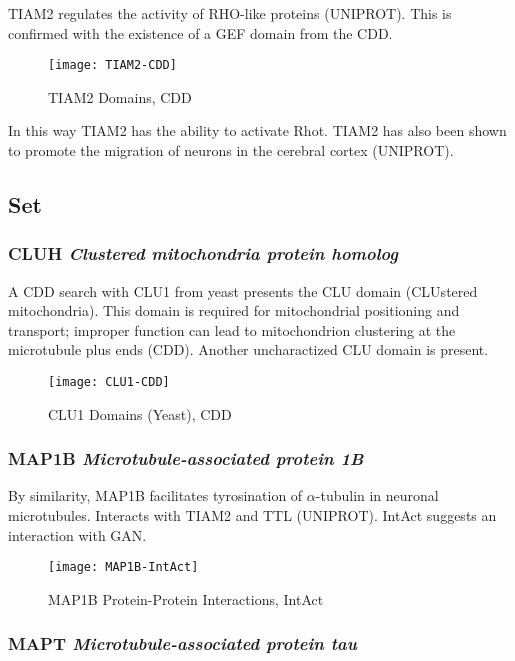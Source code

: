 TIAM2 regulates the activity of RHO-like proteins (UNIPROT). This is confirmed
with the existence of a GEF domain from the CDD.

\begin{figure}[h]
  \texttt{[image: TIAM2-CDD]}
  \caption{TIAM2 Domains, CDD}
\end{figure}



In this way TIAM2 has the ability to activate Rhot. TIAM2 has also been shown to
promote the migration of neurons in the cerebral cortex (UNIPROT).

\subsection{Set}

\subsubsection{CLUH \textit{Clustered mitochondria protein homolog}}

A CDD search with CLU1 from yeast presents the CLU domain (CLUstered
mitochondria). This domain is required for mitochondrial positioning and
transport; improper function can lead to mitochondrion clustering at the
microtubule plus ends (CDD). Another uncharactized CLU domain is present.

\begin{figure}[h]
  \texttt{[image: CLU1-CDD]}
  \caption{CLU1 Domains (Yeast), CDD}
\end{figure}

\subsubsection{MAP1B \textit{Microtubule-associated protein 1B}}

By similarity, MAP1B facilitates tyrosination of $\alpha$-tubulin in
neuronal microtubules. Interacts with TIAM2 and TTL (UNIPROT). IntAct
suggests an interaction with GAN.

\begin{figure}[h]
  \centering
    \texttt{[image: MAP1B-IntAct]}
  \caption{MAP1B Protein-Protein Interactions, IntAct}
\end{figure}

\subsubsection{MAPT \textit{Microtubule-associated protein tau}}

